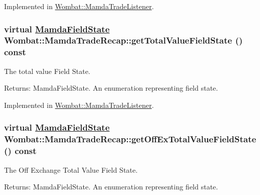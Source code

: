 Implemented in \hyperlink{classWombat_1_1MamdaTradeListener_9b42325544667eb9015a42f1cbed4f72}{Wombat::Mamda\-Trade\-Listener}.\hypertarget{classWombat_1_1MamdaTradeRecap_26e3f460f499d5bfe7e2d47a77a881ce}{
\subsubsection[getTotalValueFieldState]{\setlength{\rightskip}{0pt plus 5cm}virtual \hyperlink{namespaceWombat_93aac974f2ab713554fd12a1fa3b7d2a}{Mamda\-Field\-State} Wombat::Mamda\-Trade\-Recap::get\-Total\-Value\-Field\-State () const}}
\label{classWombat_1_1MamdaTradeRecap_26e3f460f499d5bfe7e2d47a77a881ce}


The total value Field State. 

\begin{Desc}
\item[Returns:]Mamda\-Field\-State. An enumeration representing field state. \end{Desc}


Implemented in \hyperlink{classWombat_1_1MamdaTradeListener_245a68b75564593c36b163aa87f5740b}{Wombat::Mamda\-Trade\-Listener}.\hypertarget{classWombat_1_1MamdaTradeRecap_6db0ccb47fa8aac3e063a1833d9e0208}{
\subsubsection[getOffExTotalValueFieldState]{\setlength{\rightskip}{0pt plus 5cm}virtual \hyperlink{namespaceWombat_93aac974f2ab713554fd12a1fa3b7d2a}{Mamda\-Field\-State} Wombat::Mamda\-Trade\-Recap::get\-Off\-Ex\-Total\-Value\-Field\-State () const}}
\label{classWombat_1_1MamdaTradeRecap_6db0ccb47fa8aac3e063a1833d9e0208}


The Off Exchange Total Value Field State. 

\begin{Desc}
\item[Returns:]Mamda\-Field\-State. An enumeration representing field state. \end{Desc}


